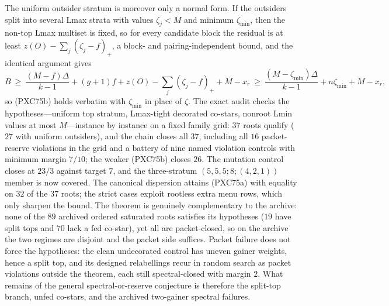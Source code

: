 \documentclass[11pt]{article}
\begin{document}
The uniform outsider stratum is moreover only a normal form.  If the
outsiders split into several Lmax strata with values $\zeta_j<M$ and
minimum $\zeta_{\min}$, then the non-top Lmax multiset is fixed, so for
every candidate block the residual is at least
$z(O)-\sum_j(\zeta_j-f)_+$, a block- and pairing-independent bound, and
the identical argument gives
\[
 B\ \ge\ \frac{(M-f)\Delta}{k-1}+(g+1)f
 +z(O)-\sum_j(\zeta_j-f)_+ +M-x_r
 \ \ge\ \frac{(M-\zeta_{\min})\Delta}{k-1}+n\zeta_{\min}+M-x_r,
\]
so (PXC75b) holds verbatim with $\zeta_{\min}$ in place of $\zeta$.  The
exact audit checks the hypotheses---uniform top stratum, Lmax-tight
decorated co-stars, nonroot Lmin values at most $M$---instance by
instance on a fixed family grid: $37$ roots qualify ($27$ with uniform
outsiders), and the chain closes all $37$, including all $16$
packet-reserve violations in the grid and a battery of nine named
violation controls with minimum margin $7/10$; the weaker (PXC75b)
closes $26$.  The mutation control closes at $23/3$ against target $7$,
and the three-stratum $(5,5,5;8;(4,2,1))$ member is now covered.  The
canonical dispersion attains (PXC75a) with equality on $32$ of the $37$
roots; the strict cases exploit rootless extra menu rows, which only
sharpen the bound.  The theorem is genuinely complementary to the
archive: none of the $89$ archived ordered saturated roots satisfies its
hypotheses ($19$ have split tops and $70$ lack a fed co-star), yet all
are packet-closed, so on the archive the two regimes are disjoint and the
packet side suffices.  Packet failure does not force the hypotheses: the clean
undecorated control has uneven gainer weights, hence a split top, and
its designed relabellings recur in random search as packet violations
outside the theorem, each still spectral-closed with margin $2$.  What
remains of the general spectral-or-reserve conjecture is therefore the
split-top branch, unfed co-stars, and the archived two-gainer spectral
failures.
\end{document}
